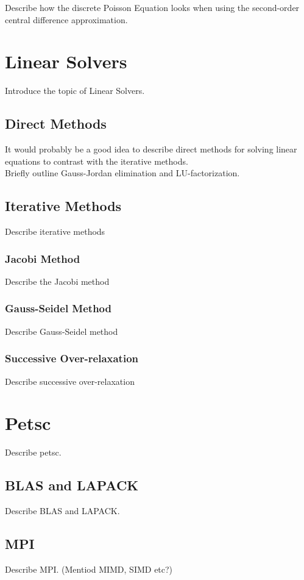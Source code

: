 Describe how the discrete Poisson Equation looks when using the second-order central difference approximation.

\section*{Linear Solvers}

Introduce the topic of Linear Solvers.

\subsection*{Direct Methods}

It would probably be a good idea to describe direct methods for solving linear equations to contrast with the iterative methods. \\
Briefly outline Gauss-Jordan elimination and LU-factorization. 

\subsection*{Iterative Methods}

Describe iterative methods

\subsubsection*{Jacobi Method}

Describe the Jacobi method

\subsubsection*{Gauss-Seidel Method}

Describe Gauss-Seidel method

\subsubsection*{Successive Over-relaxation}

Describe successive over-relaxation

\section*{Petsc}

Describe petsc.

\subsection*{BLAS and LAPACK}

Describe BLAS and LAPACK.

\subsection*{MPI}

Describe MPI. (Mentiod MIMD, SIMD etc?)


